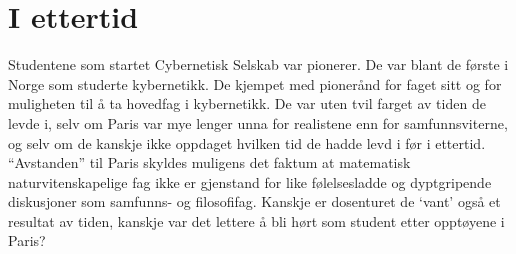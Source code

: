 \documentclass[../../main.tex]{subfiles}
\begin{document}
\section{I ettertid}

Studentene som startet Cybernetisk Selskab var pionerer. De var blant de første i Norge som studerte kybernetikk. De kjempet med pionerånd for faget sitt og for muligheten til å ta hovedfag i kybernetikk. De var uten tvil farget av tiden de levde i, selv om Paris var mye lenger unna for realistene enn for samfunnsviterne, og selv om de kanskje ikke oppdaget hvilken tid de hadde levd i før i ettertid. ``Avstanden'' til Paris skyldes muligens det faktum at matematisk naturvitenskapelige fag ikke er gjenstand for like følelsesladde og dyptgripende diskusjoner som samfunns- og filosofifag. Kanskje er dosenturet de `vant' også et resultat av tiden, kanskje var det lettere å bli hørt som student etter opptøyene i Paris?
\end{document}
